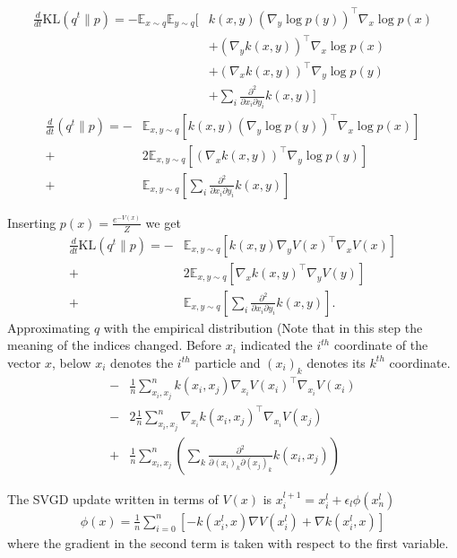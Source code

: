 \documentclass{article}
\begin{document}
\begin{align}
    \frac{d}{dt} \text{KL}( q^t \| p ) = - \mathbb{E}_{x\sim q} \mathbb{E}_{y \sim q} \big[
        & k(x,y) (\nabla_y \log p(y))^\top \nabla_x \log p(x) \\
        &+ (\nabla_y k(x,y) )^\top \nabla_x \log p(x) \\
        &+ (\nabla_x k(x,y) )^\top \nabla_y \log p(y) \\
        &+ \sum_i \frac{ \partial^2 }{ \partial x_i \partial y_i } k(x,y) \big]
\end{align}
\begin{align}
    \frac{d}{dt}    ( q^t \| p ) =
    -& \mathbb{E}_{x,y\sim q} \left[ k(x,y) (\nabla_y \log p(y))^\top \nabla_x \log p(x) \right] \\ 
    +& 2 \mathbb{E}_{x,y\sim q} \left[ (\nabla_x k(x,y) )^\top \nabla_y \log p(y) \right] \\ 
    +& \mathbb{E}_{x,y\sim q} \left[ \sum_i \frac{ \partial^2 }{ \partial x_i \partial y_i } k(x,y) \right]
\end{align}

Inserting $p(x) = \frac{e^{-V(x)}}{Z}$ we get
\begin{align}
    \frac{d}{dt} \text{KL}( q^t \| p ) =
    -& \mathbb{E}_{x,y\sim q} \left[ k(x,y) \nabla_y V(x)^\top \nabla_x V(x) \right] \\ 
    +& 2 \mathbb{E}_{x,y\sim q} \left[ \nabla_x k(x,y)^\top \nabla_y V(y) \right] \\ 
    +& \mathbb{E}_{x,y\sim q} \left[ \sum_i \frac{ \partial^2 }{ \partial x_i \partial y_i } k(x,y) \right]
    .
\end{align}
Approximating $q$ with the empirical distribution
(Note that in this step the meaning of the indices changed. Before $x_i$ indicated the $i^{th}$
coordinate of the vector $x$, below $x_i$ denotes the $i^{th}$ particle and $(x_i)_k$ denotes
its $k^{th}$ coordinate.
\begin{align}
    -& \frac{1}{n}\sum_{x_i,x_j}^n  k(x_i,x_j) \nabla_{x_i} V(x_i)^\top \nabla_{x_i} V(x_i)  \\ 
    -& 2 \frac{1}{n}\sum_{x_i,x_j}^n  \nabla_{x_i} k(x_i,x_j)^\top \nabla_{x_i} V(x_j)  \\ 
    +& \frac{1}{n}\sum_{x_i,x_j}^n \left( \sum_k \frac{ \partial^2 }{ \partial (x_i)_k \partial (x_j)_k } 
        k(x_i,x_j) \right)
\end{align}

The SVGD update written in terms of $V(x)$ is $x_i^{l+1} = x_i^l + \epsilon_l \phi(x_n^l)$
\begin{align}
    \phi(x) = \frac{1}{n} \sum_{i=0}^{n} \left[
        - k(x_i^l, x) \nabla V(x_i^l) + \nabla k(x_i^l, x)
    \right]
\end{align}
where the gradient in the second term is taken with respect to the first variable.
\end{document}

